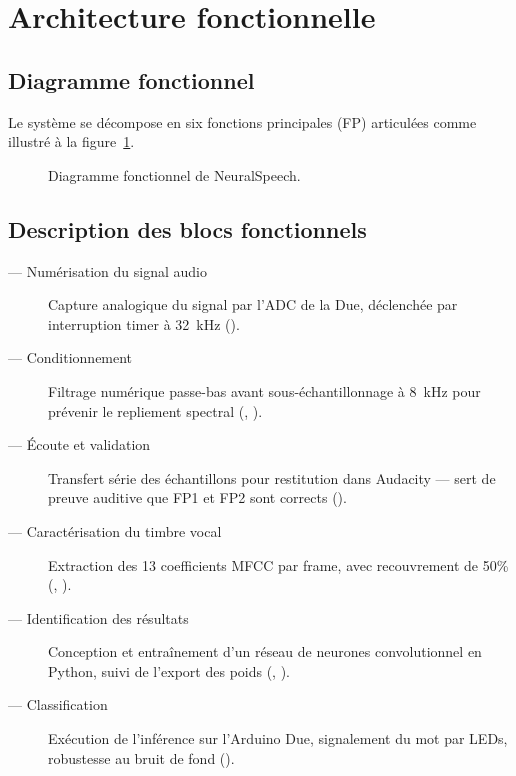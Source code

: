 \section{Architecture fonctionnelle}
\label{sec:architecture}

\subsection{Diagramme fonctionnel}

Le système se décompose en six fonctions principales (FP) articulées comme illustré à la figure~\ref{fig:diag-fonctionnel}.

\begin{figure}[H]
\centering
{}
\caption{Diagramme fonctionnel de NeuralSpeech.}
\label{fig:diag-fonctionnel}
\end{figure}

\subsection{Description des blocs fonctionnels}

\begin{description}
    \item[ --- Numérisation du signal audio] Capture analogique du signal par l'ADC de la Due, déclenchée par interruption timer à \SI{32}{\kilo\hertz} ().
    \item[ --- Conditionnement] Filtrage numérique passe-bas avant sous-échantillonnage à \SI{8}{\kilo\hertz} pour prévenir le repliement spectral (, ).
    \item[ --- Écoute et validation] Transfert série des échantillons pour restitution dans Audacity --- sert de preuve auditive que FP1 et FP2 sont corrects ().
    \item[ --- Caractérisation du timbre vocal] Extraction des 13 coefficients MFCC par frame, avec recouvrement de 50\% (, ).
    \item[ --- Identification des résultats] Conception et entraînement d'un réseau de neurones convolutionnel en Python, suivi de l'export des poids (, ).
    \item[ --- Classification] Exécution de l'inférence sur l'Arduino Due, signalement du mot par LEDs, robustesse au bruit de fond ().
\end{description}

